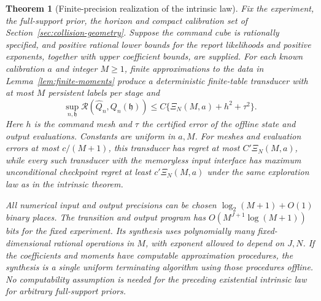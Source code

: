 \documentclass[11pt]{amsart}
\newtheorem{theorem}{Theorem}[section]
\theoremstyle{definition}\newtheorem{definition}[theorem]{Definition}
\theoremstyle{remark}\newtheorem{remark}[theorem]{Remark}
\begin{document}
\begin{theorem}[Finite-precision realization of the intrinsic law]
\label{thm:digital-intrinsic}
Fix the experiment, the full-support prior, the horizon and compact
calibration set of Section~\ref{sec:collision-geometry}. Suppose the
command cube is rationally specified, and positive rational lower bounds
for the report likelihoods and positive exponents, together with upper
coefficient bounds, are supplied. For each known calibration $a$ and
integer $M\ge1$, finite approximations to the data in
Lemma~\ref{lem:finite-moments} produce a deterministic finite-table
transducer with at most $M$ persistent labels per stage and
\begin{equation}\label{eq:digital-intrinsic}
 \sup_{n,\mathfrak h}\mathcal R(\widehat Q_n,Q_n(\mathfrak h))
 \le C\{\Xi_N(M,a)+h^2+\tau^2\}.
\end{equation}
Here $h$ is the command mesh and $\tau$ the certified error of the
offline state and output evaluations. Constants are uniform in $a,M$.
For meshes and evaluation errors at most $c/(M+1)$, this transducer
has regret at most $C'\Xi_N(M,a)$, while every such transducer with the memoryless input interface has
maximum unconditional checkpoint regret at least $c'\Xi_N(M,a)$
under the same exploration law as in the intrinsic theorem.

All numerical input and output precisions can be chosen
$\log_2(M+1)+O(1)$ binary places. The transition and output program has
$O(M^{J+1}\log(M+1))$ bits for the fixed experiment. Its synthesis
uses polynomially many fixed-dimensional rational operations in $M$,
with exponent allowed to depend on $J,N$. If the coefficients and
moments have computable approximation procedures, the synthesis is a
single uniform terminating algorithm using those procedures offline.
No computability assumption is needed for the preceding existential
intrinsic law for arbitrary full-support priors.
\end{theorem}
\end{document}

